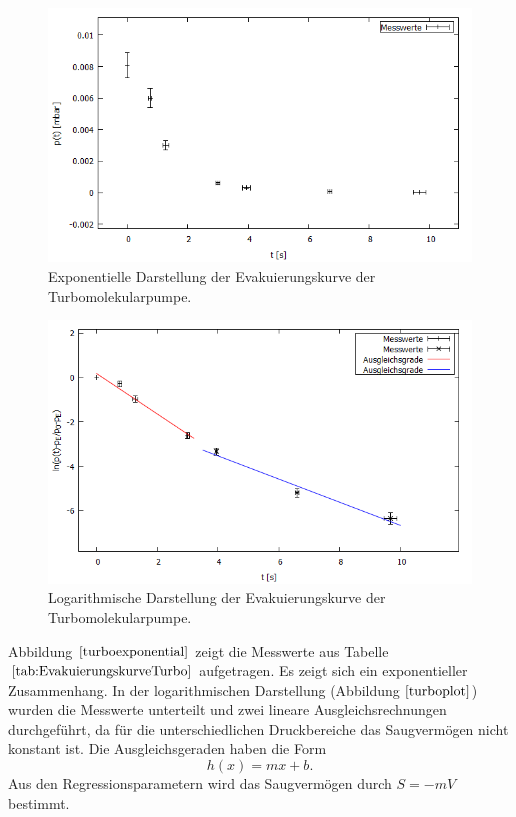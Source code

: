 \begin{figure}[H]
  \centering
  \includegraphics[width=14cm]{bilder/thefinalfinalplot.png}
  \caption{Exponentielle Darstellung der Evakuierungskurve der Turbomolekularpumpe.}
  \label{turboexponential}
\end{figure}

\begin{figure}[H]
  \centering
  \includegraphics[width=14cm]{bilder/turbodruckplot.png}
  \caption{Logarithmische Darstellung der Evakuierungskurve der Turbomolekularpumpe.}
  \label{turboplot}
\end{figure}
Abbildung $\ref{turboexponential}$ zeigt die Messwerte aus Tabelle $\ref{tab:EvakuierungskurveTurbo}$ aufgetragen.
Es zeigt sich ein exponentieller Zusammenhang.
In der logarithmischen Darstellung (Abbildung $\ref{turboplot}$) wurden die Messwerte unterteilt und zwei lineare Ausgleichsrechnungen durchgeführt, da für die unterschiedlichen Druckbereiche das Saugvermögen nicht konstant ist.
Die Ausgleichsgeraden haben die Form
\begin{equation}
 h(x)=mx+b.
\end{equation}
Aus den Regressionsparametern wird das Saugvermögen durch $S=-mV$ bestimmt.\\

